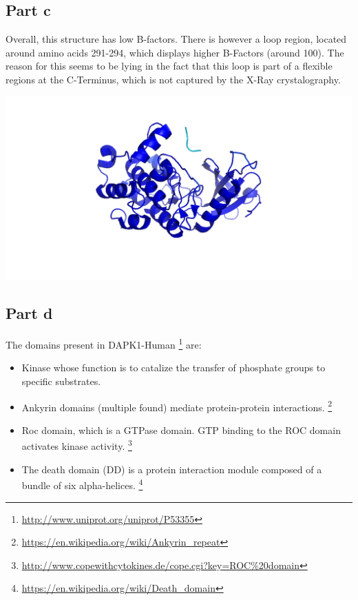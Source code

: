 \documentclass[11pt, a4paper,titlepage]{article}
\begin{document}
\subsection*{Part c}

Overall, this structure has low B-factors. There is however a loop
region, located around amino acids 291-294, which displays higher
B-Factors (around 100). The reason for this seems to be lying in the
fact that this loop is part of a flexible regions at the C-Terminus,
which is not captured by the X-Ray crystalography.

\includegraphics[width=15cm]{./Figures/5c.png}

\subsection*{Part d}

The domains present in DAPK1-Human
\footnote{\url{http://www.uniprot.org/uniprot/P53355}} are:

\begin{itemize}
\item Kinase whose function is to catalize the transfer of phosphate
  groups to specific substrates.
\item Ankyrin domains (multiple found) mediate protein-protein
  interactions.
  \footnote{\url{https://en.wikipedia.org/wiki/Ankyrin_repeat}}
\item Roc domain, which is a GTPase domain. GTP binding to the ROC
  domain activates kinase activity.
  \footnote{\url{http://www.copewithcytokines.de/cope.cgi?key=ROC\%20domain}} 
\item The death domain (DD) is a protein interaction module composed
  of a bundle of six alpha-helices.
  \footnote{\url{https://en.wikipedia.org/wiki/Death_domain}}
\end{itemize}
\end{document}

